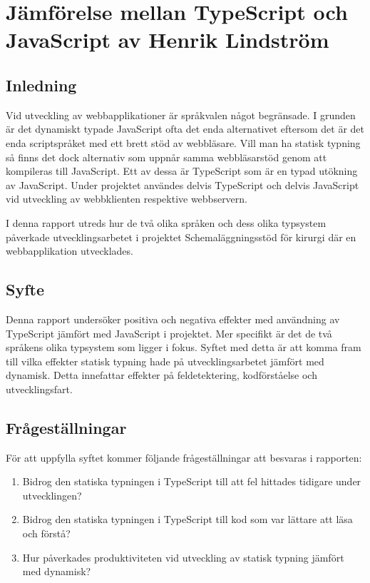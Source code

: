 \chapter{Jämförelse mellan TypeScript och JavaScript av Henrik Lindström}

\section{Inledning}
Vid utveckling av webbapplikationer är språkvalen något begränsade. I grunden är det dynamiskt typade JavaScript ofta det enda alternativet eftersom det är det enda scriptspråket med ett brett stöd av webbläsare. Vill man ha statisk typning så finns det dock alternativ som uppnår samma webbläsarstöd genom att kompileras till JavaScript. Ett av dessa är TypeScript som är en typad utökning av JavaScript. Under projektet användes delvis TypeScript och delvis JavaScript vid utveckling av webbklienten respektive webbservern.

I denna rapport utreds hur de två olika språken och dess olika typsystem påverkade utvecklingsarbetet i projektet Schemaläggningsstöd för kirurgi där en webbapplikation utvecklades.
\section{Syfte}
Denna rapport undersöker positiva och negativa effekter med användning av TypeScript jämfört med JavaScript i projektet. Mer specifikt är det de två språkens olika typsystem som ligger i fokus. Syftet med detta är att komma fram till vilka effekter statisk typning hade på utvecklingsarbetet jämfört med dynamisk. Detta innefattar effekter på feldetektering, kodförståelse och utvecklingsfart. 

\section{Frågeställningar}
För att uppfylla syftet kommer följande frågeställningar att besvaras i rapporten:
\begin{enumerate}
\item Bidrog den statiska typningen i TypeScript till att fel hittades tidigare under utvecklingen?
\item Bidrog den statiska typningen i TypeScript till kod som var lättare att läsa och förstå?
\item Hur påverkades produktiviteten vid utveckling av statisk typning jämfört med dynamisk?
\end{enumerate}
